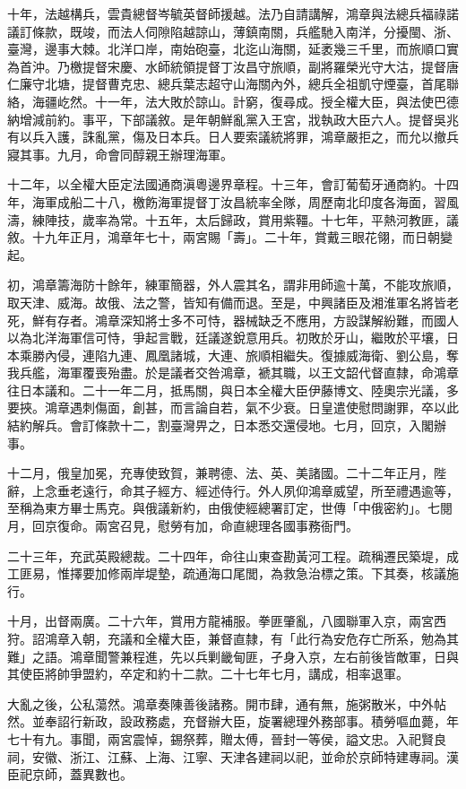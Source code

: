\begin{pinyinscope}
十年，法越構兵，雲貴總督岑毓英督師援越。法乃自請講解，鴻章與法總兵福祿諾議訂條款，既竣，而法人伺隙陷越諒山，薄鎮南關，兵艦馳入南洋，分擾閩、浙、臺灣，邊事大棘。北洋口岸，南始砲臺，北迄山海關，延袤幾三千里，而旅順口實為首沖。乃檄提督宋慶、水師統領提督丁汝昌守旅順，副將羅榮光守大沽，提督唐仁廉守北塘，提督曹克忠、總兵葉志超守山海關內外，總兵全祖凱守煙臺，首尾聯絡，海疆屹然。十一年，法大敗於諒山。計窮，復尋成。授全權大臣，與法使巴德納增減前約。事平，下部議敘。是年朝鮮亂黨入王宮，戕執政大臣六人。提督吳兆有以兵入護，誅亂黨，傷及日本兵。日人要索議統將罪，鴻章嚴拒之，而允以撤兵寢其事。九月，命會同醇親王辦理海軍。

十二年，以全權大臣定法國通商滇粵邊界章程。十三年，會訂葡萄牙通商約。十四年，海軍成船二十八，檄飭海軍提督丁汝昌統率全隊，周歷南北印度各海面，習風濤，練陣技，歲率為常。十五年，太后歸政，賞用紫韁。十七年，平熱河教匪，議敘。十九年正月，鴻章年七十，兩宮賜「壽」。二十年，賞戴三眼花翎，而日朝變起。

初，鴻章籌海防十餘年，練軍簡器，外人震其名，謂非用師逾十萬，不能攻旅順，取天津、威海。故俄、法之警，皆知有備而退。至是，中興諸臣及湘淮軍名將皆老死，鮮有存者。鴻章深知將士多不可恃，器械缺乏不應用，方設謀解紛難，而國人以為北洋海軍信可恃，爭起言戰，廷議遂銳意用兵。初敗於牙山，繼敗於平壤，日本乘勝內侵，連陷九連、鳳凰諸城，大連、旅順相繼失。復據威海衛、劉公島，奪我兵艦，海軍覆喪殆盡。於是議者交咎鴻章，褫其職，以王文韶代督直隸，命鴻章往日本議和。二十一年二月，抵馬關，與日本全權大臣伊藤博文、陸奧宗光議，多要挾。鴻章遇刺傷面，創甚，而言論自若，氣不少衰。日皇遣使慰問謝罪，卒以此結約解兵。會訂條款十二，割臺灣畀之，日本悉交還侵地。七月，回京，入閣辦事。

十二月，俄皇加冕，充專使致賀，兼聘德、法、英、美諸國。二十二年正月，陛辭，上念垂老遠行，命其子經方、經述侍行。外人夙仰鴻章威望，所至禮遇逾等，至稱為東方畢士馬克。與俄議新約，由俄使經總署訂定，世傳「中俄密約」。七閱月，回京復命。兩宮召見，慰勞有加，命直總理各國事務衙門。

二十三年，充武英殿總裁。二十四年，命往山東查勘黃河工程。疏稱遷民築堤，成工匪易，惟擇要加修兩岸堤墊，疏通海口尾閭，為救急治標之策。下其奏，核議施行。

十月，出督兩廣。二十六年，賞用方龍補服。拳匪肇亂，八國聯軍入京，兩宮西狩。詔鴻章入朝，充議和全權大臣，兼督直隸，有「此行為安危存亡所系，勉為其難」之語。鴻章聞警兼程進，先以兵剿畿甸匪，孑身入京，左右前後皆敵軍，日與其使臣將帥爭盟約，卒定和約十二款。二十七年七月，講成，相率退軍。

大亂之後，公私蕩然。鴻章奏陳善後諸務。開市肆，通有無，施粥散米，中外帖然。並奉詔行新政，設政務處，充督辦大臣，旋署總理外務部事。積勞嘔血薨，年七十有九。事聞，兩宮震悼，錫祭葬，贈太傅，晉封一等侯，謚文忠。入祀賢良祠，安徽、浙江、江蘇、上海、江寧、天津各建祠以祀，並命於京師特建專祠。漢臣祀京師，蓋異數也。


\end{pinyinscope}
